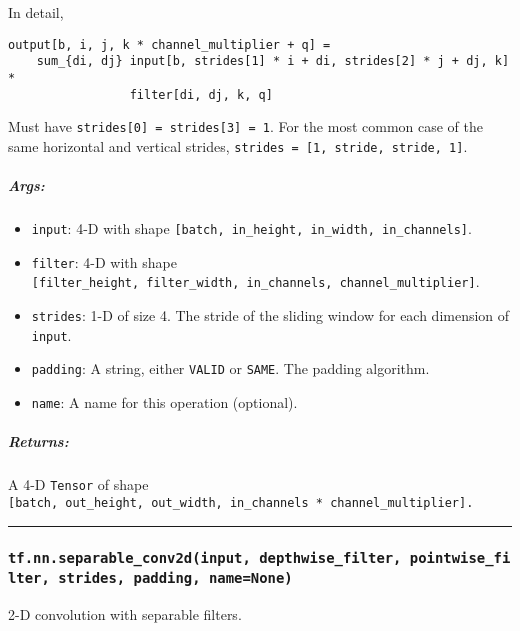 In detail,

\begin{verbatim}
output[b, i, j, k * channel_multiplier + q] =
    sum_{di, dj} input[b, strides[1] * i + di, strides[2] * j + dj, k] *
                 filter[di, dj, k, q]
\end{verbatim}

Must have \texttt{strides{[}0{]}\ =\ strides{[}3{]}\ =\ 1}. For the most
common case of the same horizontal and vertical strides,
\texttt{strides\ =\ {[}1,\ stride,\ stride,\ 1{]}}.

\subparagraph{Args: }\label{args-8}

\begin{itemize}
\tightlist
\item
  \texttt{input}: 4-D with shape
  \texttt{{[}batch,\ in\_height,\ in\_width,\ in\_channels{]}}.
\item
  \texttt{filter}: 4-D with shape
  \texttt{{[}filter\_height,\ filter\_width,\ in\_channels,\ channel\_multiplier{]}}.
\item
  \texttt{strides}: 1-D of size 4. The stride of the sliding window for
  each dimension of \texttt{input}.
\item
  \texttt{padding}: A string, either
  \texttt{\textquotesingle{}VALID\textquotesingle{}} or
  \texttt{\textquotesingle{}SAME\textquotesingle{}}. The padding
  algorithm.
\item
  \texttt{name}: A name for this operation (optional).
\end{itemize}

\subparagraph{Returns: }\label{returns-8}

A 4-D \texttt{Tensor} of shape
\texttt{{[}batch,\ out\_height,\ out\_width,\ in\_channels\ *\ channel\_multiplier{]}.}

\begin{center}\rule{0.5\linewidth}{\linethickness}\end{center}

\subsubsection{\texorpdfstring{\texttt{tf.nn.separable\_conv2d(input,\ depthwise\_filter,\ pointwise\_filter,\ strides,\ padding,\ name=None)}
}{tf.nn.separable\_conv2d(input, depthwise\_filter, pointwise\_filter, strides, padding, name=None) }}\label{tf.nn.separableux5fconv2dinput-depthwiseux5ffilter-pointwiseux5ffilter-strides-padding-namenone}

2-D convolution with separable filters.

